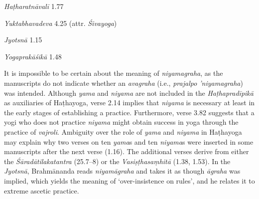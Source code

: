 \begin{ekdosis}
\begin{testimonia}[hp01_015]
\emph{Haṭharatnāvalī} 1.77

\begin{versinnote}
\tl{\var{niyamagrahaḥ ] niyamāgrahaḥ N,J}\\!}
\end{versinnote}

\emph{Yuktabhavadeva} 4.25 (attr. \emph{Śivayoga})

\begin{versinnote}
\end{versinnote}

\emph{Jyotsnā} 1.15

\begin{versinnote}
\end{versinnote}

\emph{Yogaprakāśikā} 1.48

\begin{versinnote}
\end{versinnote}

\end{testimonia}

\begin{philcomm}[hp01_015]        
It is impossible to be certain about the meaning of \emph{niyamagraha}, as the manuscripts do not indicate whether an \emph{avagraha} (i.e., \emph{prajalpo ’niyamagraha}) was intended. Although \emph{yama} and \emph{niyama} are not included in the \emph{Haṭhapradīpikā} as auxiliaries of Haṭhayoga, verse 2.14 implies that \emph{niyama} is necessary at least in the early stages of establishing a practice. Furthermore, verse 3.82 suggests that a yogi who does not practice \emph{niyama} might obtain success in yoga through the practice of \textit{vajroli}. Ambiguity over the role of \emph{yama} and \emph{niyama} in Haṭhayoga may explain why two verses on ten \emph{yama}s and ten \emph{niyama}s were inserted in some manuscripts after the next verse (1.16). The additional verses derive from either the \emph{Śāradātilakatantra} (25.7–8) or the  \emph{Vasiṣṭhasaṃhitā} (1.38, 1.53). In the \emph{Jyotsnā}, Brahmānanda reads \emph{niyamāgraha} and takes it as though \emph{āgraha} was implied, which yields the meaning of ‘over-insistence on rules’, and he relates it to extreme ascetic practice.
\end{philcomm}


\end{ekdosis}
